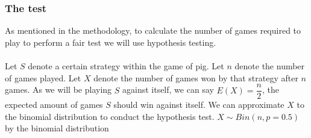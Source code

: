 \documentclass[a4paper,titlepage]{article}
\begin{document}
\subsubsection{The test}
As mentioned in the methodology, to calculate the number of games required to play to perform a fair test we will use hypothesis testing.\\ \\
Let $S$ denote a certain strategy within the game of pig.
Let $n$ denote the number of games played.
Let $X$ denote the number of games won by that strategy after $n$ games.
As we will be playing $S$ against itself, we can say $E(X) =
\dfrac{n}{2}$, the expected amount of games $S$ should win against itself.
We can approximate $X$ to the binomial distribution to conduct the hypothesis test.
$X \sim Bin(n , p=0.5)$
by the binomial distribution
\end{document}
